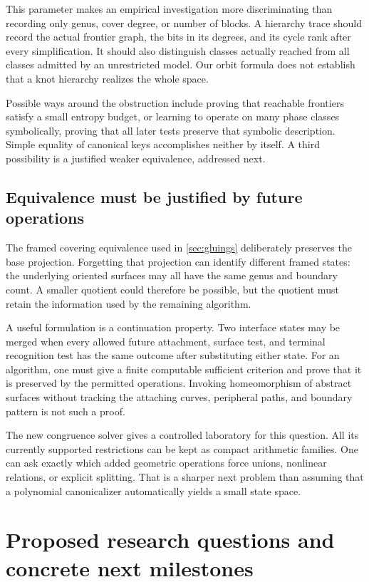 This parameter makes an empirical investigation more discriminating than
recording only genus, cover degree, or number of blocks. A hierarchy trace
should record the actual frontier graph, the bits in its degrees, and its
cycle rank after every simplification. It should also distinguish classes
actually reached from all classes admitted by an unrestricted model. Our
orbit formula does not establish that a knot hierarchy realizes the whole
space.

Possible ways around the obstruction include proving
that reachable frontiers satisfy a small entropy budget, or learning to
operate on many phase classes symbolically, proving that all later tests
preserve that symbolic description. Simple equality of canonical keys
accomplishes neither by itself. A third possibility is a justified weaker
equivalence, addressed next.

\subsection{Equivalence must be justified by future operations}

The framed covering equivalence used in \cref{sec:gluings} deliberately
preserves the base projection. Forgetting that projection can identify
different framed states: the underlying oriented surfaces may all have the
same genus and boundary count. A smaller quotient could therefore be
possible, but the quotient must retain the information used by the remaining
algorithm.

A useful formulation is a continuation property. Two interface states may
be merged when every allowed future attachment, surface test, and terminal
recognition test has the same outcome after substituting either state.
For an algorithm, one must give a finite computable sufficient criterion
and prove that it is preserved by the permitted operations. Invoking
homeomorphism of abstract surfaces without tracking the attaching curves,
peripheral paths, and boundary pattern is not such a proof.

The new congruence solver gives a controlled laboratory for this question.
All its currently supported restrictions can be kept as compact arithmetic
families. One can ask exactly which added geometric operations force unions,
nonlinear relations, or explicit splitting. That is a sharper next problem
than assuming that a polynomial canonicalizer automatically yields a small
state space.

\section{Proposed research questions and concrete next milestones}
\label{sec:agenda}

